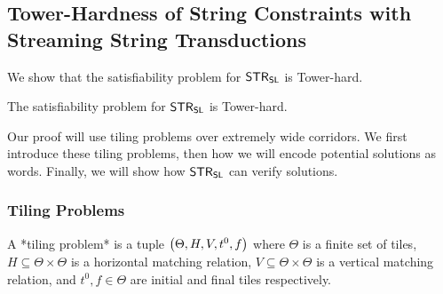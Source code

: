 
\newcommand\scon{S}
\newcommand\svar{x}
\newcommand\alphabet{\Sigma}

\newcommand\rebrac[1]{\left[#1\right]}

\newcommand\idxi{i}
\newcommand\idxj{j}
\newcommand\idxk{k}
\newcommand\numof{n}

\newcommand\tiles{\Theta}
\newcommand\nontiles{\overline{\Theta}}
\newcommand\hrel{H}
\newcommand\vrel{V}
\newcommand\inittile{\tile^0}
\newcommand\fintile{f}
\newcommand\tile{t}
\newcommand\vartile{d}
\newcommand\linlen{\numof}
\newcommand\tileheight{h}
\newcommand\expheight{m}
\newcommand\spacer{\#}
\newcommand\isnum[2]{R^{#2}_{#1}}
\newcommand\lmark{\langle}
\newcommand\rmark{\rangle}
\newcommand\sftrue[1]{\top_{#1}}
\newcommand\sffalse[1]{\bot_{#1}}
\newcommand\sfvalue{v}

\newcommand\tilesnum[1]{\tiles_{#1}}
\newcommand\hrelnum[1]{\hrel_{#1}}
\newcommand\vrelnum[1]{\vrel_{#1}}
\newcommand\inittilenum[1]{\inittile_{#1}}
\newcommand\fintilenum[1]{\fintile_{#1}}
\newcommand\nmax[1]{N_{#1}}
\newcommand\tenc[2]{[#2]_{#1}}

\newcommand\fullrow[1]{
    \tenc{\expheight}{1} \tile^{#1}_1
        \ldots
        \tenc{\expheight}{\nmax{\expheight}}
            \tile^{#1}_{\nmax{\expheight}}
}

\subsection{Tower-Hardness of String Constraints with Streaming String Transductions}
\label{sec:tower-hard}

We show that the satisfiability problem for $\mathsf{STR}_{\mathsf{SL}}$ is Tower-hard.

\begin{theorem}
The satisfiability problem for $\mathsf{STR}_{\mathsf{SL}}$ is Tower-hard.
\end{theorem}

Our proof will use tiling problems over extremely wide corridors.
We first introduce these tiling problems, then how we will encode potential solutions as words.
Finally, we will show how $\mathsf{STR}_{\mathsf{SL}}$ can verify solutions.

\subsubsection{Tiling Problems}

A *tiling problem* is a tuple
$\tup{\tiles, \hrel, \vrel, \inittile, \fintile}$
where
    $\tiles$ is a finite set of tiles,
    $\hrel \subseteq \tiles \times \tiles$ is a horizontal matching relation,
    $\vrel \subseteq \tiles \times \tiles$ is a vertical matching relation, and
    $\inittile, \fintile \in \tiles$ are initial and final tiles respectively.

